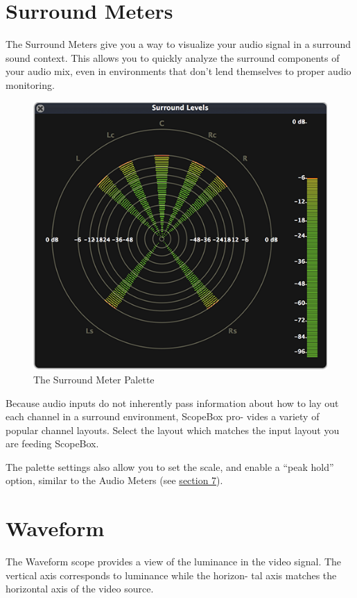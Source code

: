 \documentclass[10,letterpaper,]{report}
\begin{document}
\chapter{Surround Meters}

The Surround Meters give you a way to visualize your audio signal in a
surround sound context. This allows you to quickly analyze the surround
components of your audio mix, even in environments that don't lend
themselves to proper audio monitoring.

\begin{figure}[htbp]
\centering
\includegraphics{images/SurroundLevels.png}
\caption{The Surround Meter Palette}
\end{figure}

Because audio inputs do not inherently pass information about how to lay
out each channel in a surround environment, ScopeBox pro- vides a
variety of popular channel layouts. Select the layout which matches the
input layout you are feeding ScopeBox.

The palette settings also allow you to set the scale, and enable a
``peak hold'' option, similar to the Audio Meters (see
\hyperref[Audio-Meters]{section 7}).

\chapter{Waveform}

The Waveform scope provides a view of the luminance in the video signal.
The vertical axis corresponds to luminance while the horizon- tal axis
matches the horizontal axis of the video source.
\end{document}
